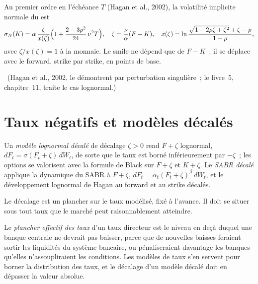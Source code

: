 \begin{proposition}\label{prop:rc:sabr-in-rates-and-the-volatility-cube:normalexp}
Au premier ordre en l'échéance $T$ (Hagan et al., 2002), la volatilité implicite
normale du  est
\[
\sigma_N(K) = \alpha\,\frac{\zeta}{x(\zeta)}\Bigl(1+\frac{2-3\rho^2}{24}\,\nu^2T\Bigr),
\quad \zeta = \frac{\nu}{\alpha}(F-K),\quad
x(\zeta) = \ln\frac{\sqrt{1-2\rho\zeta+\zeta^2}+\zeta-\rho}{1-\rho},
\]
avec $\zeta/x(\zeta)=1$ à la monnaie. Le smile ne dépend que de $F-K$~:
il se déplace avec le forward, strike par strike, en points de base.
\end{proposition}
\admitted\ (Hagan et al., 2002, le démontrent par perturbation singulière~; le livre~5,
chapitre~11, traite le cas lognormal.)

\label{lst:rc:sabr-in-rates-and-the-volatility-cube:hagan}

\section{Taux négatifs et modèles décalés}

\begin{definition}\label{def:rc:sabr-in-rates-and-the-volatility-cube:shifted}
Un \emph{modèle lognormal décalé} de décalage
$\zeta>0$ rend $F+\zeta$ lognormal, $dF_t=\sigma(F_t+\zeta)\,dW_t$, de sorte que le
taux est borné inférieurement par $-\zeta$~; les options se valorisent avec la formule de Black sur
$F+\zeta$ et $K+\zeta$. Le \emph{SABR décalé} applique la dynamique du
SABR à $F+\zeta$, $dF_t=\alpha_t(F_t+\zeta)^\beta\,dW_t$, et le développement lognormal
de Hagan au forward et au strike décalés.
\end{definition}

Le décalage est un plancher sur le taux modélisé, fixé à l'avance. Il doit se situer
sous tout taux que le marché peut raisonnablement atteindre.

\begin{definition}\label{def:rc:sabr-in-rates-and-the-volatility-cube:elb}
Le \emph{plancher effectif des taux} d'un taux directeur est
le niveau en deçà duquel une banque centrale ne devrait pas baisser, parce que de nouvelles
baisses feraient sortir les liquidités du système bancaire, ou pénaliseraient davantage
les banques qu'elles n'assoupliraient les conditions. Les modèles de taux s'en servent pour borner
la distribution des taux, et le décalage d'un modèle décalé doit en dépasser la valeur absolue.
\end{definition}

